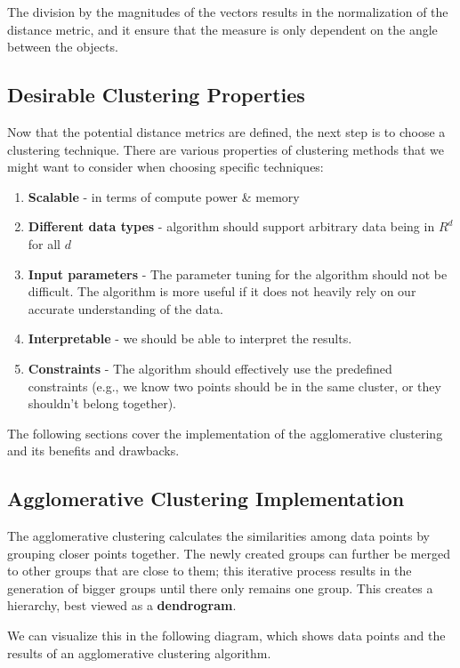 \documentclass{article}
\begin{document}
The division by the magnitudes of the vectors results in the normalization of the distance metric, and it ensure that the measure is only dependent on the angle between the objects.

\subsection{Desirable Clustering Properties}

Now that the potential distance metrics are defined, the next step is to choose a clustering technique. There are various properties of clustering methods that we might want to consider when choosing specific techniques:

\begin{enumerate}
	\item \textbf{Scalable} - in terms of compute power \& memory
	\item \textbf{Different data types} - algorithm should support arbitrary data being in $R^d$ for all $d$
	\item \textbf{Input parameters} - The parameter tuning for the algorithm should not be difficult. The algorithm is more useful if it does not heavily rely on our accurate understanding of the data.
	\item \textbf{Interpretable} - we should be able to interpret the results.
	\item \textbf{Constraints} - The algorithm should effectively use the predefined constraints (e.g., we know two points should be in the same cluster, or they shouldn't belong together).
\end{enumerate}

The following sections cover the implementation of the  agglomerative clustering and its benefits and drawbacks.

\subsection{Agglomerative Clustering Implementation}

The agglomerative clustering calculates the similarities among data points by grouping closer points together. The newly created groups can further be merged to other groups that are close to them; this iterative process results in the generation of bigger groups until there only remains one group. This creates a hierarchy, best viewed as a \textbf{dendrogram}.

We can visualize this in the following diagram, which shows data points and the results of an agglomerative clustering algorithm.
\end{document}
